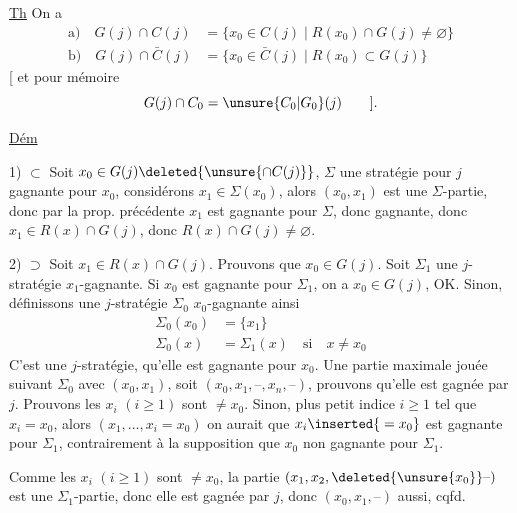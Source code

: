 \uline{Th} On a 
\[
 \begin{aligned}
 \text{a)}\quad G(j)\cap C(j)&=\{x_0\in C(j)\mid R(x_0)\cap G(j)\ne\varnothing\}\\
 \text{b)}\quad G(j)\cap\bar C(j)&=\{x_0\in\bar C(j)\mid R(x_0)\subset G(j)\}
 \end{aligned}
\]
[ et pour mémoire
\[
 G(j)\cap C_0=\unsure{C_0|G_0}(j)\qquad ].
\]

\uline{Dém} 

 1) $\subset$ Soit $x_0\in G(j)\deleted{\unsure{\cap C(j)}}$,  $\Sigma$ une stratégie pour $j$ gagnante pour $x_0$, considérons $x_1\in\Sigma(x_0)$, alors $(x_0,x_1)$ est une $\Sigma$-partie, donc par la prop. précédente $x_1$ est gagnante pour $\Sigma$, donc gagnante, donc $x_1\in R(x)\cap G(j)$, donc $R(x)\cap G(j)\ne\varnothing$.

2) $\supset$ Soit $x_1\in R(x)\cap G(j)$. Prouvons que $x_0\in G(j)$.  Soit $\Sigma_1$ une $j$-stratégie $x_1$-gagnante. Si $x_0$ est gagnante pour $\Sigma_1$, on a $x_0\in G(j)$, OK. Sinon, définissons une $j$-stratégie $\Sigma_0$ $x_0$-gagnante ainsi
\[
 \begin{aligned}
 \Sigma_0(x_0)&=\{x_1\}\\
 \Sigma_0(x)&=\Sigma_1(x)\quad\text{si}\quad x\ne x_0
 \end{aligned}
\]
C'est une $j$-stratégie,  qu'elle est gagnante pour $x_0$. Une partie maximale jouée suivant $\Sigma_0$  avec $(x_0,x_1)$, soit $(x_0,x_1,\text{--},x_n,\text{--})$,  prouvons qu'elle est gagnée par $j$. Prouvons  les $x_i$ $(i\geq1)$ sont $\ne x_0$. Sinon,  plus petit indice $i\geq1$ tel que $x_i=x_0$,  alors  $(x_1,\ldots,x_i=x_0)$  on aurait que $x_{i}\inserted{{}=x_0}$ est gagnante pour $\Sigma_1$, contrairement à la supposition que $x_0$ non gagnante pour $\Sigma_1$.

Comme les $x_i$ $(i\geq1)$ sont $\ne x_0$, la partie $(x_1,x_2,\deleted{\unsure{x_0}}\text{--})$ est une $\Sigma_1$-partie, donc elle est gagnée par $j$, donc $(x_0,x_1,\text{--})$ aussi, cqfd.

